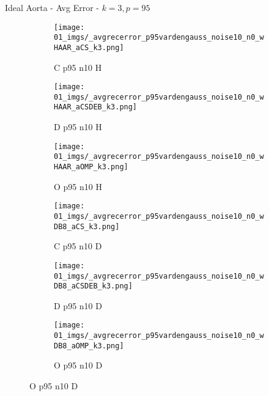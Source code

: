 \begin{frame}{Ideal Aorta - Avg Error - $k=3,p=95$}{}
\begin{figure}
\begin{subfigure}{0.13\textwidth}
\texttt{[image: 01\_imgs/\_avgrecerror\_p95vardengauss\_noise10\_n0\_wHAAR\_aCS\_k3.png]}
\caption*{\tiny C p95 n10 H}
\end{subfigure}
\begin{subfigure}{0.13\textwidth}
\texttt{[image: 01\_imgs/\_avgrecerror\_p95vardengauss\_noise10\_n0\_wHAAR\_aCSDEB\_k3.png]}
\caption*{\tiny D p95 n10 H}
\end{subfigure}
\begin{subfigure}{0.13\textwidth}
\texttt{[image: 01\_imgs/\_avgrecerror\_p95vardengauss\_noise10\_n0\_wHAAR\_aOMP\_k3.png]}
\caption*{\tiny O p95 n10 H}
\end{subfigure}
\begin{subfigure}{0.13\textwidth}
\texttt{[image: 01\_imgs/\_avgrecerror\_p95vardengauss\_noise10\_n0\_wDB8\_aCS\_k3.png]}
\caption*{\tiny C p95 n10 D}
\end{subfigure}
\begin{subfigure}{0.13\textwidth}
\texttt{[image: 01\_imgs/\_avgrecerror\_p95vardengauss\_noise10\_n0\_wDB8\_aCSDEB\_k3.png]}
\caption*{\tiny D p95 n10 D}
\end{subfigure}
\begin{subfigure}{0.13\textwidth}
\texttt{[image: 01\_imgs/\_avgrecerror\_p95vardengauss\_noise10\_n0\_wDB8\_aOMP\_k3.png]}
\caption*{\tiny O p95 n10 D}
\end{subfigure}

\vspace{5pt}


\end{figure}
\end{frame}
